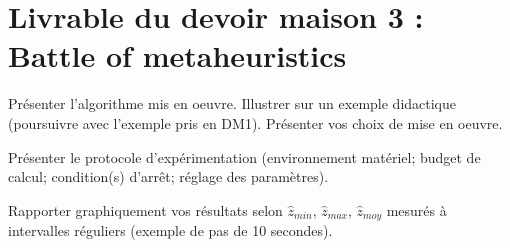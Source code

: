 
\section*{Livrable du devoir maison 3 : \\ Battle of metaheuristics}

%
%

\vspace{5mm}
\noindent
{}
\vspace{2mm}

\noindent
Présenter l'algorithme mis en oeuvre. Illustrer sur un exemple didactique (poursuivre avec l'exemple pris en DM1). Présenter vos choix de mise en oeuvre.


%
%

\vspace{5mm}
\noindent
{}
\vspace{2mm}

\noindent
Présenter le protocole d'expérimentation (environnement matériel; budget de calcul; condition(s) d'arrêt; réglage des paramètres).

\noindent
Rapporter graphiquement vos résultats selon $\hat{z}_{min}$, $\hat{z}_{max}$, $\hat{z}_{moy}$ mesurés à intervalles réguliers (exemple de pas de 10 secondes).

